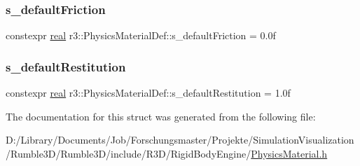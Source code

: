 \mbox{\label{structr3_1_1_physics_material_def_a491a5e29b693bd20a7a8708f13c7f473}} 
\subsubsection{\texorpdfstring{s\+\_\+default\+Friction}{s\_defaultFriction}}
{\footnotesize\ttfamily constexpr \mbox{\hyperlink{namespacer3_ab2016b3e3f743fb735afce242f0dc1eb}{real}} r3\+::\+Physics\+Material\+Def\+::s\+\_\+default\+Friction = 0.\+0f\hspace{0.3cm}{\ttfamily [static]}}

\mbox{\label{structr3_1_1_physics_material_def_a994308068cb88f266dd5f9f63f320add}} 
\subsubsection{\texorpdfstring{s\+\_\+default\+Restitution}{s\_defaultRestitution}}
{\footnotesize\ttfamily constexpr \mbox{\hyperlink{namespacer3_ab2016b3e3f743fb735afce242f0dc1eb}{real}} r3\+::\+Physics\+Material\+Def\+::s\+\_\+default\+Restitution = 1.\+0f\hspace{0.3cm}{\ttfamily [static]}}



The documentation for this struct was generated from the following file\+:\begin{DoxyCompactItemize}
\item 
D\+:/\+Library/\+Documents/\+Job/\+Forschungsmaster/\+Projekte/\+Simulation\+Visualization/\+Rumble3\+D/\+Rumble3\+D/include/\+R3\+D/\+Rigid\+Body\+Engine/\mbox{\hyperlink{_physics_material_8h}{Physics\+Material.\+h}}\end{DoxyCompactItemize}
